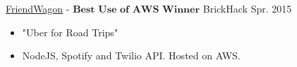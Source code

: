 \documentclass[11pt]{article}
\begin{document}
\headedsubsection
{{\href{https://github.com/alanplotko/RoadTrip}{FriendWagon}} - $\textbf{Best Use of AWS Winner}$ }
{BrickHack Spr. 2015}
{
    \begin{itemize}[label={}]
    	\setlength\itemsep{.005ex}
        \item{"Uber for Road Trips"}
        \item{NodeJS, Spotify and Twilio API. Hosted on AWS.}
    \end{itemize}
}
\end{document}
